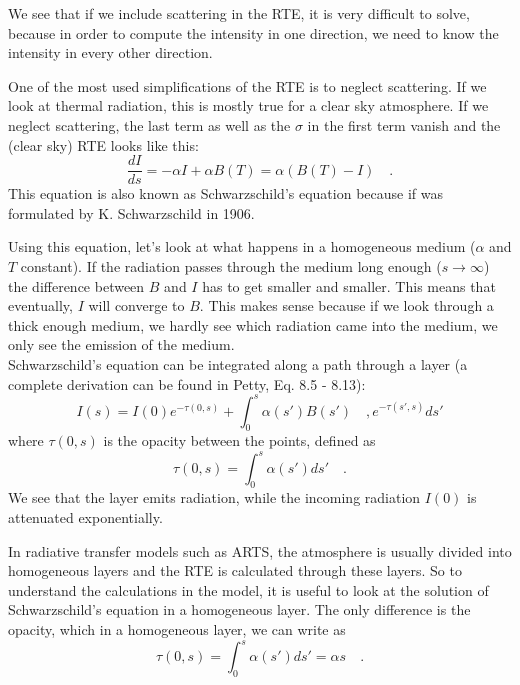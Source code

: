 We see that if we include scattering in the RTE, it is very difficult to solve, because 
in order to compute the intensity in one direction, we need to know the intensity in 
every other direction.

One of the most used simplifications of the RTE is to neglect scattering. If we look at
thermal radiation, this is mostly true for a clear sky atmosphere. If we neglect 
scattering, the last term as well as the $\sigma$ in the first term vanish and the 
(clear sky) RTE looks like this:
\begin{equation}
	\frac{dI}{ds} = -\alpha I + \alpha B(T) = \alpha ( B(T) - I ) \quad .
\end{equation}
This equation is also known as Schwarzschild's equation because if was formulated by 
K. Schwarzschild in 1906. 

Using this equation, let's look at what happens in a homogeneous medium ($\alpha$ and $T$
constant). If the radiation passes through the medium long enough ($s \rightarrow \infty$)
the difference between $B$ and $I$ has to get smaller and smaller. This means that eventually,
$I$ will converge to $B$. This makes sense because if we look through a thick enough medium, 
we hardly see which radiation came into the medium, we only see the emission of the medium.\\
Schwarzschild's equation can be integrated along a path through a layer
(a complete derivation can be found in Petty, Eq. 8.5 - 8.13):
\begin{equation}
	I(s) = I(0) e^{-\tau (0,s)} + \int_{0}^{s} \alpha (s') B(s')  \quad ,
	e^{-\tau (s',s)} ds' 
\end{equation}
where $\tau(0,s)$ is the opacity between the points, defined as
\begin{equation}
	\tau (0,s) = \int_{0}^{s} \alpha(s') ds' \quad .
\end{equation}
We see that the layer emits radiation, while the incoming radiation $I(0)$ is 
attenuated exponentially. 

In radiative transfer models such as ARTS, the atmosphere is usually divided 
into homogeneous layers and the RTE is calculated through these layers. So to understand
the calculations in the model, it is useful to look at the solution of Schwarzschild's
equation in a homogeneous layer. The only difference is the opacity, which in a homogeneous
layer, we can write as
\begin{equation}
	\tau(0,s) = \int_{0}^{s} \alpha(s') ds' = \alpha s \quad .
\end{equation}

